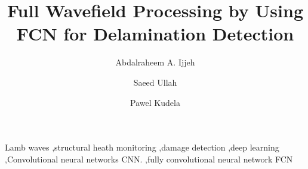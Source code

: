 \documentclass[preprint,9pt]{elsarticle}
\begin{document}
	\begin{frontmatter}
		
		\title{Full Wavefield Processing by Using FCN for Delamination Detection}
		
		\address[IFFM]{Institute of Fluid Flow Machinery, Polish Academy of Sciences, Poland}
		
		\author{Abdalraheem A. Ijjeh}
		\author{Saeed Ullah }
		\author{Pawel Kudela}
		
		
		\begin{abstract}
		
		\end{abstract}
		
		\begin{keyword}
			Lamb waves \sep structural heath monitoring \sep damage detection \sep deep learning \sep Convolutional neural networks CNN. \sep fully convolutional neural network FCN
			
			
		\end{keyword}
		
	\end{frontmatter}

\end{document}
